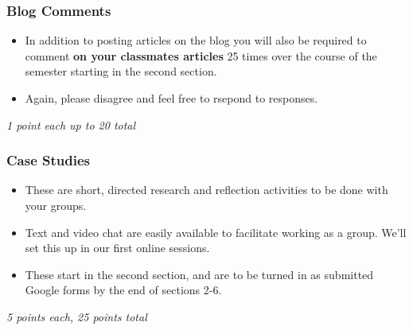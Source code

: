 \documentclass[
]{article}
\providecommand{\tightlist}{%
  \setlength{\itemsep}{0pt}\setlength{\parskip}{0pt}}
\begin{document}
\begin{assignment}

\hypertarget{blog-comments}{%
\subsubsection{Blog Comments}\label{blog-comments}}

\begin{itemize}
\tightlist
\item
  In addition to posting articles on the blog you will also be required
  to comment \textbf{on your classmates articles} 25 times over the
  course of the semester starting in the second section.
\item
  Again, please disagree and feel free to rsepond to responses.
\end{itemize}

\emph{1 point each up to 20 total}

\end{assignment}

\begin{assignment}

\hypertarget{case-studies}{%
\subsubsection{Case Studies}\label{case-studies}}

\begin{itemize}
\tightlist
\item
  These are short, directed research and reflection activities to be
  done with your groups.
\item
  Text and video chat are easily available to facilitate working as a
  group. We'll set this up in our first online sessions.
\item
  These start in the second section, and are to be turned in as
  submitted Google forms by the end of sections 2-6.
\end{itemize}

\emph{5 points each, 25 points total}

\end{assignment}
\end{document}
